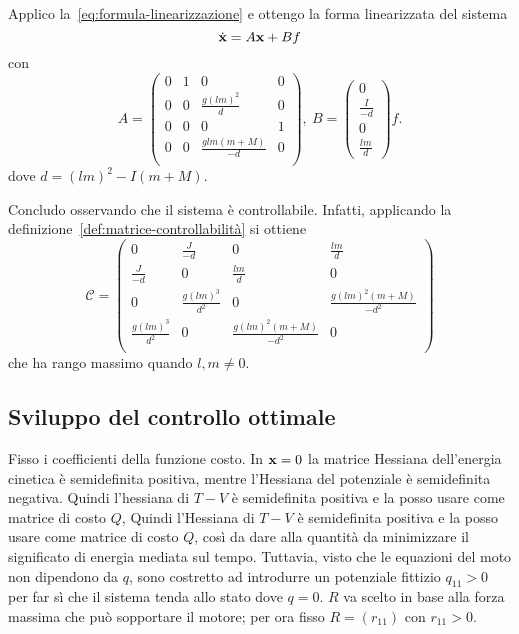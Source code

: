 Applico la~\ref{eq:formula-linearizzazione} e ottengo la forma linearizzata
del sistema
\begin{equation*}
        \dot {\mathbf{x}} = A\mathbf{x} + Bf \\
\end{equation*}
con
\begin{equation*}
    A = \left(
            \begin{array}{cccc}
                0&1&0&0\\
                0&0&\frac{g(lm)^2}{d}&0\\
                0&0&0&1\\
                0&0&\frac{glm(m+M)}{-d}&0\\
            \end{array}
        \right),\
    B = \left(\begin{array}{c}0\\\frac{I}{-d}\\0\\\frac{lm}{d}\end{array}\right)f.
\end{equation*}
dove $d = (lm)^2-I(m+M)$.

Concludo osservando che il sistema è controllabile.
Infatti, applicando la definizione~\ref{def:matrice-controllabilità}
si ottiene
\begin{equation*}
    \mathcal C = \left(
        \begin{array}{cccc}
            0&\frac J {-d}&0&\frac{lm} d\\
            \frac J {-d}&0&\frac{lm} d&0\\
            0&\frac{g(lm)^3}{d^2}&0&\frac{g(lm)^2(m+M)}{-d^2}\\
            \frac{g(lm)^3}{d^2}&0&\frac{g(lm)^2(m+M)}{-d^2}&0\\
        \end{array}
        \right)
\end{equation*}
che ha rango massimo quando $l, m \neq 0$.

\subsection{Sviluppo del controllo ottimale}
Fisso i coefficienti della funzione costo.
In $\mathbf{x} = 0$ la matrice Hessiana dell'energia cinetica è
semidefinita positiva, mentre l'Hessiana del potenziale è
semidefinita negativa.
Quindi l'hessiana di $T - V$ è semidefinita positiva e
la posso usare come matrice di costo $Q$,
Quindi l'Hessiana di $T - V$ è semidefinita positiva e
la posso usare come matrice di costo $Q$,
così da dare alla quantità
da minimizzare il significato di energia mediata sul tempo.
Tuttavia, visto che le equazioni del moto non dipendono da $q$,
sono costretto ad introdurre un potenziale fittizio
$q_{11} > 0$ per far sì che il sistema tenda allo
stato dove $q = 0$.
$R$ va scelto in base alla forza massima che può sopportare
il motore; per ora fisso $R = (r_{11})$ con $r_{11} > 0$.

